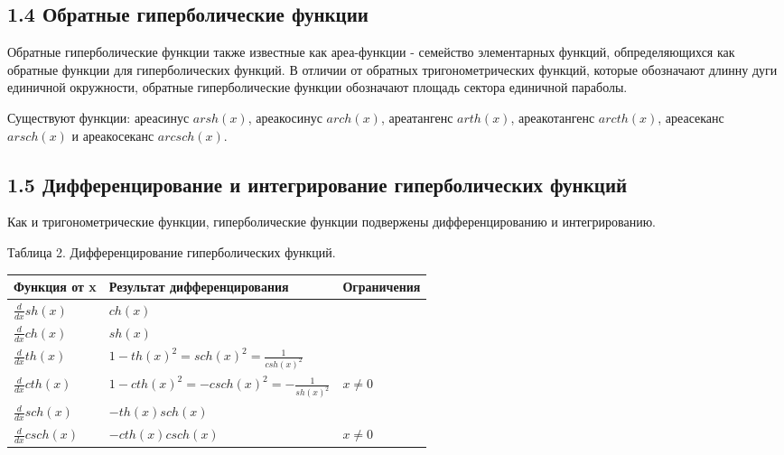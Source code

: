 \subsection*{1.4 Обратные гиперболические функции}

Обратные гиперболические функции также известные как ареа-функции - семейство элементарных функций, обпределяющихся как обратные функции для гиперболических функций. В отличии от обратных тригонометрических функций, которые обозначают длинну дуги единичной окружности, обратные гиперболические функции обозначают площадь сектора единичной параболы.

Существуют функции: ареасинус $arsh(x)$, ареакосинус $arch(x)$, ареатангенс $arth(x)$, ареакотангенс $arcth(x)$, ареасеканс $arsch(x)$ и ареакосеканс $arcsch(x)$.

\subsection*{1.5 Дифференцирование и интегрирование гиперболических функций}
Как и тригонометрические функции, гиперболические функции подвержены дифференцированию и интегрированию.

Таблица 2. Дифференцирование гиперболических функций.
\begin{center}
    \begin{tabular}{| p{3cm} | p{7cm} | p{3cm} |}
        \hline
        Функция от x & Результат дифференцирования & Ограничения\\ \hline
        $\frac{d}{dx}sh(x)$ & $ch(x)$ & \\ \hline
        $\frac{d}{dx}ch(x)$ & $sh(x)$ & \\ \hline
        $\frac{d}{dx}th(x)$ & $1-th(x)^2=sch(x)^2=\frac{1}{csh(x)^2}$ & \\ \hline
        $\frac{d}{dx}cth(x)$ & $1-cth(x)^2=-csch(x)^2=-\frac{1}{sh(x)^2}$ & $x\neq0$\\ \hline
        $\frac{d}{dx}sch(x)$ & $-th(x)sch(x)$ & \\ \hline
        $\frac{d}{dx}csch(x)$ & $-cth(x)csch(x)$ & $x\neq0$\\ \hline
    \end{tabular}
\end{center}

